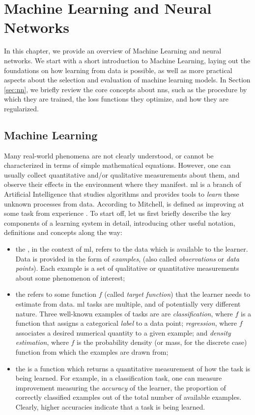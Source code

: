 \chapter{Machine Learning and Neural Networks}\label{ch:neural-networks}
In this chapter, we provide an overview of Machine Learning and neural networks. We start with a short introduction to Machine Learning, laying out the foundations on how learning from data is possible, as well as more practical aspects about the selection and evaluation of machine learning models. In Section \ref{sec:nn}, we briefly review the core concepts about \glspl{nn}, such as the procedure by which they are trained, the loss functions they optimize, and how they are regularized.

\section{Machine Learning}\label{sec:ml}
Many real-world phenomena are not clearly understood, or cannot be characterized in terms of simple mathematical equations. However, one can usually collect quantitative and/or qualitative measurements about them, and observe their effects in the environment where they manifest. \gls{ml} is a branch of Artificial Intelligence that studies algorithms and provides tools to \emph{learn} these unknown processes from data. According to Mitchell,  is defined as improving at some task from experience \citep{mitchell1997ml}. To start off, let us first briefly describe the key components of a learning system in detail, introducing other useful notation, definitions and concepts along the way:

\begin{itemize}
    \item the , in the context of \gls{ml}, refers to
    the data which is available to the learner. Data is provided in the form
    of \emph{examples}, (also called \emph{observations} or \emph{data points}). Each example is a set of qualitative or quantitative measurements about some phenomenon of interest;
    \item the  refers to some function $f$ (called \emph{target function}) that the learner needs to estimate from data. \gls{ml} tasks are multiple, and of potentially very different nature. Three well-known examples of tasks are are \emph{classification}, where $f$ is a function that assigns a categorical \emph{label} to a data point; \emph{regression}, where $f$ associates a desired numerical quantity to a given example; and \emph{density estimation}, where $f$ is the probability density (or mass, for the discrete case) function from which the examples are drawn from;
    \item the  is a function which returns a quantitative measurement of how  the task is being learned. For example, in a classification task, one can measure improvement measuring the \emph{accuracy} of the learner, \ie the proportion of correctly classified examples out of the total number of available examples. Clearly, higher accuracies indicate that a task is being learned.
\end{itemize}

